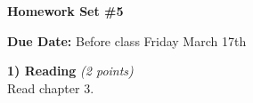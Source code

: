 

\def\xyprime{\ensuremath{\begin{pmatrix} x' \\ y' \end{pmatrix}}}



\thispagestyle{fancy}






\begin{center}
{\huge \textbf{Homework Set \#5}}
\large

{\textbf{ Due Date:} Before class Friday March 17th  }
\end{center}

\textbf{1) Reading } \hfill \textit{(2 points)}\\
Read chapter 3.

\vspace*{0.25in}


